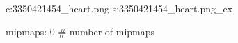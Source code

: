 c:3350421454\textures\skel_heart.png
s:3350421454\textures\skel_heart.png_ex

mipmaps: 0  # number of mipmaps
